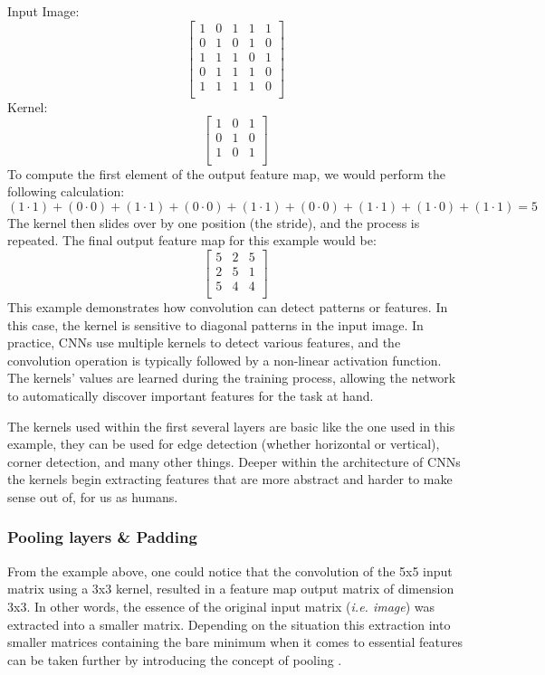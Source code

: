 \noindent Input Image:
\[
\begin{bmatrix}
1 & 0 & 1 & 1 & 1 \\
0 & 1 & 0 & 1 & 0 \\
1 & 1 & 1 & 0 & 1 \\
0 & 1 & 1 & 1 & 0 \\
1 & 1 & 1 & 1 & 0 \\
\end{bmatrix}
\]
Kernel:
\[
\begin{bmatrix}
1 & 0 & 1 \\
0 & 1 & 0 \\
1 & 0 & 1 \\
\end{bmatrix}
\]
To compute the first element of the output feature map, we would perform the following calculation:
\[
(1 \cdot 1) + (0 \cdot 0) + (1 \cdot 1) + (0 \cdot 0) + (1 \cdot 1) + (0 \cdot 0) + (1 \cdot 1) + (1 \cdot 0) + (1 \cdot 1) = 5
\]
The kernel then slides over by one position (the stride), and the process is repeated. The final output feature map for this example would be:
\[
\begin{bmatrix}
5 & 2 & 5 \\
2 & 5 & 1 \\
5 & 4 & 4\\
\end{bmatrix}
\]
This example demonstrates how convolution can detect patterns or features. In this case, the kernel is sensitive to diagonal patterns in the input image.
In practice, CNNs use multiple kernels to detect various features, and the convolution operation is typically followed by a non-linear activation function. The kernels' values are learned during the training process, allowing the network to automatically discover important features for the task at hand.

The kernels used within the first several layers are basic like the one used in this example, they can be used for edge detection (whether horizontal or vertical), corner detection, and many other things. Deeper within the architecture of CNNs the kernels begin extracting features that are more abstract and harder to make sense out of, for us as humans.

\subsubsection{Pooling layers \& Padding}
From the example above, one could notice that the convolution of the 5x5 input matrix using a 3x3 kernel, resulted in a feature map output matrix of dimension 3x3. In other words, the essence of the original input matrix (\textit{i.e. image}) was extracted into a smaller matrix. Depending on the situation this extraction into smaller matrices containing the bare minimum when it comes to essential features can be taken further by introducing the concept of pooling \cite{lecun2015deep}.

